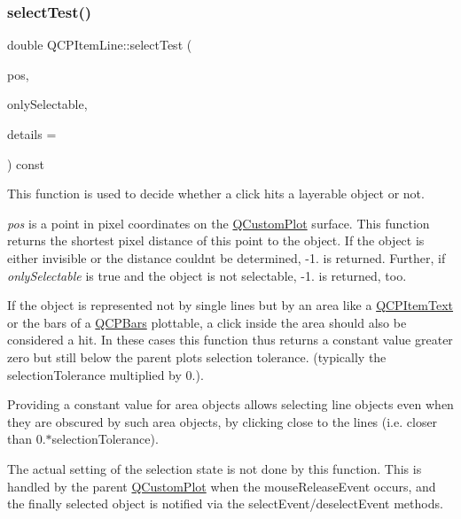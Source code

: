 \subsubsection{\texorpdfstring{select\+Test()}{selectTest()}}
{\footnotesize\ttfamily double Q\+C\+P\+Item\+Line\+::select\+Test (\begin{DoxyParamCaption}\item[{const Q\+PointF \&}]{pos,  }\item[{bool}]{only\+Selectable,  }\item[{Q\+Variant $\ast$}]{details = {} }\end{DoxyParamCaption}) const\hspace{0.3cm}{\ttfamily [virtual]}}

This function is used to decide whether a click hits a layerable object or not.

{\itshape pos} is a point in pixel coordinates on the \mbox{\hyperlink{class_q_custom_plot}{Q\+Custom\+Plot}} surface. This function returns the shortest pixel distance of this point to the object. If the object is either invisible or the distance couldn\textquotesingle{}t be determined, -\/1. is returned. Further, if {\itshape only\+Selectable} is true and the object is not selectable, -\/1. is returned, too.

If the object is represented not by single lines but by an area like a \mbox{\hyperlink{class_q_c_p_item_text}{Q\+C\+P\+Item\+Text}} or the bars of a \mbox{\hyperlink{class_q_c_p_bars}{Q\+C\+P\+Bars}} plottable, a click inside the area should also be considered a hit. In these cases this function thus returns a constant value greater zero but still below the parent plot\textquotesingle{}s selection tolerance. (typically the selection\+Tolerance multiplied by 0.).

Providing a constant value for area objects allows selecting line objects even when they are obscured by such area objects, by clicking close to the lines (i.\+e. closer than 0.$\ast$selection\+Tolerance).

The actual setting of the selection state is not done by this function. This is handled by the parent \mbox{\hyperlink{class_q_custom_plot}{Q\+Custom\+Plot}} when the mouse\+Release\+Event occurs, and the finally selected object is notified via the select\+Event/deselect\+Event methods.

